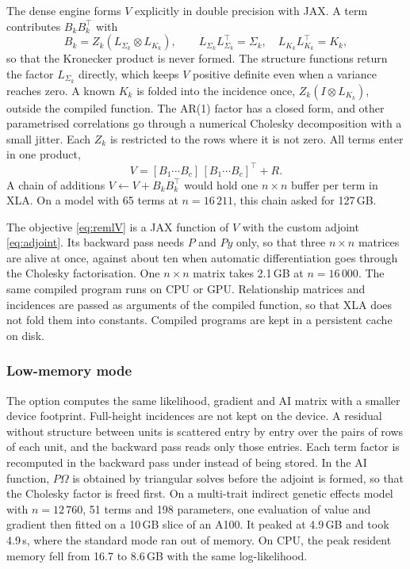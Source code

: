 \documentclass[article,nojss]{jss}
\renewcommand{\pkg}[1]{#1}
\begin{document}
The dense engine forms $V$ explicitly in double precision with \pkg{JAX}. A
term contributes $B_k B_k^\top$ with
\begin{equation}\label{eq:factor}
  B_k = Z_k (L_{\Sigma_k} \otimes L_{K_k}),
  \qquad L_{\Sigma_k}L_{\Sigma_k}^\top = \Sigma_k,
  \quad L_{K_k}L_{K_k}^\top = K_k ,
\end{equation}
so that the Kronecker product is never formed. The structure functions return
the factor $L_{\Sigma_k}$ directly, which keeps $V$ positive definite even
when a variance reaches zero. A known $K_k$ is folded into the incidence once,
$Z_k(I \otimes L_{K_k})$, outside the compiled function. The AR(1) factor has
a closed form, and other parametrised correlations go through a numerical
Cholesky decomposition with a small jitter. Each $Z_k$ is restricted to the
rows where it is not zero. All terms enter in one product,
\begin{equation}\label{eq:oneproduct}
  V = [B_1 \cdots B_c]\,[B_1 \cdots B_c]^\top + R .
\end{equation}
A chain of additions $V \leftarrow V + B_kB_k^\top$ would hold one $n \times n$
buffer per term in \pkg{XLA}. On a model with 65 terms at $n = 16\,211$, this
chain asked for 127\,GB.

The objective \eqref{eq:remlV} is a \pkg{JAX} function of $V$ with the custom
adjoint \eqref{eq:adjoint}. Its backward pass needs $P$ and $Py$ only, so that
three $n \times n$ matrices are alive at once, against about ten when automatic
differentiation goes through the Cholesky factorisation. One $n \times n$ matrix
takes 2.1\,GB at $n = 16\,000$. The same compiled program runs on CPU or GPU.
Relationship matrices and incidences are passed as arguments of the compiled
function, so that \pkg{XLA} does not fold them into constants. Compiled
programs are kept in a persistent cache on disk.

\subsubsection{Low-memory mode}

The option  computes the same likelihood, gradient and AI
matrix with a smaller device footprint. Full-height incidences are not kept on
the device. A residual without structure between units is scattered entry by
entry over the pairs of rows of each unit, and the backward pass reads only
those entries. Each term factor is recomputed in the backward pass under
 instead of being stored. In the AI function, $P\Omega$ is
obtained by triangular solves before the adjoint is formed, so that the
Cholesky factor is freed first. On a multi-trait indirect genetic effects
model with $n = 12\,760$, 51 terms and 198 parameters, one evaluation of value
and gradient then fitted on a 10\,GB slice of an A100. It peaked at 4.9\,GB
and took 4.9\,s, where the standard mode ran out of memory. On CPU, the peak
resident memory fell from 16.7 to 8.6\,GB with the same log-likelihood.
\end{document}
